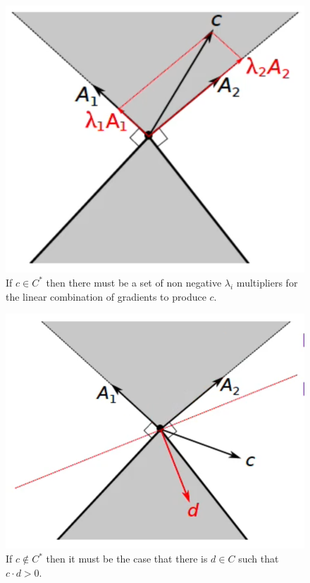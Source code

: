 \begin{figure}
    \centering
    \includegraphics[scale=0.5]{figures/3/chapter3-farkas2.png}
    \caption{If $c \in C^*$ then there must be a set of non negative $\lambda_i$ multipliers for the linear combination of gradients to produce $c$.}
    \label{fig:chapter3-farkas2}
\end{figure}
\begin{figure}
    \centering
    \includegraphics[scale=0.5]{figures/3/chapter3-farkas3.png}
    \caption{If $c \notin C^*$ then it must be the case that there is $d \in C$ such that $c \cdot d > 0$.}
    \label{fig:chapter3-farkas3}
\end{figure}
